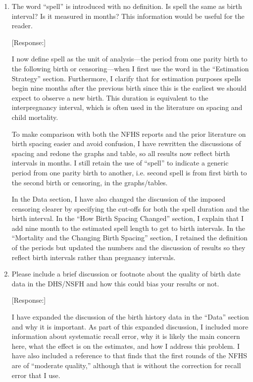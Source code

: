 \documentclass[letterpaper,12pt]{article}
\begin{document}
\begin{enumerate}
\item The word ``spell'' is introduced with no definition. Is spell the
same as birth interval? Is it measured in months? This information would
be useful for the reader.

[Response:]

I now define spell as the unit of analysis---the period from one parity birth to 
the following birth or censoring---when I first use the word in the ``Estimation 
Strategy'' section.
Furthermore, I clarify that for estimation purposes spells begin nine months 
after the previous birth since this is the earliest we should expect to observe 
a new birth.
This duration is equivalent to the interpregnancy interval, which is often used in 
the literature on spacing and child mortality.

To make comparison with both the NFHS reports and the prior literature on
birth spacing easier and avoid confusion, I have rewritten the discussions of 
spacing and redone the graphs and table, so all results now reflect birth 
intervals in months.
I still retain the use of ``spell'' to indicate a generic period from one parity 
birth to another, i.e. second spell is from first birth to the second birth or
censoring, in the graphs/tables.


In the Data section, I have also changed the discussion of the imposed censoring 
clearer by specifying the cut-offs for both the spell duration and the birth interval.
In the ``How Birth Spacing Changed'' section, I explain that I add nine month
to the estimated spell length to get to birth intervals.
In the ``Mortality and the Changing Birth Spacing'' section, I retained the
definition of the periods but updated the numbers and the discussion of
results so they reflect birth intervals rather than pregnancy intervals.



\item Please include a brief discussion or footnote about the quality of
birth date data in the DHS/NSFH and how this could bias your results or
not.

[Response:]

I have expanded the discussion of the birth history data in the ``Data'' section and
why it is important.
As part of this expanded discussion, I included more information about systematic
recall error, why it is likely the main concern here, what the effect is on the
estimates, and how I address this problem.
I have also included a reference to \citet{Schoumaker2014} that finds that the first
rounds of the NFHS are of ``moderate quality,'' although that is without the correction
for recall error that I use.



\end{enumerate}
\end{document}
